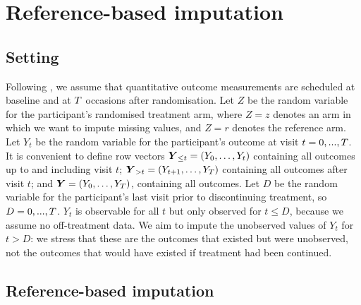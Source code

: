 
\section{Reference-based imputation}

\subsection{Setting} 
Following \citet{ian:RBIcausal},
we assume that quantitative outcome measurements are scheduled at baseline and at $T$ occasions after randomisation. 
Let $Z$ be the random variable for the participant's randomised treatment arm, where $Z=z$ denotes an arm in which we want to impute missing values, and $Z=r$ denotes the reference arm.
Let $Y_t$ be the random variable for the participant's outcome at visit $t=0,...,T$. 
It is convenient to define row vectors
$\boldsymbol{Y}_{{\le{t}}}=(Y_0,\ldots,Y_t)$ containing all outcomes up to  and including visit $t$; 
$\boldsymbol{Y}_{{>t}}=(Y_{t+1},\ldots,Y_T)$ containing all outcomes after visit $t$; 
and
$\boldsymbol{Y}=(Y_0,\ldots,Y_T)$, containing all outcomes.
Let $D$ be the random variable for the participant's last visit prior to discontinuing treatment, so $D=0,...,T$.
$Y_t$ is observable for all $t$ but only observed for $t \le D$, because we assume no off-treatment data. 
We aim to impute the unobserved values of $Y_t$ for $t>D$: we stress that these are the outcomes that existed but were unobserved, not the outcomes that would have existed if treatment had been continued.


\subsection{Reference-based imputation}


